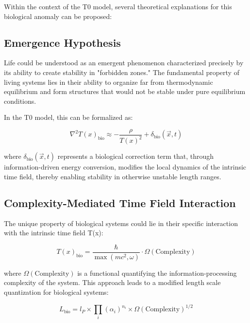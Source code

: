 \documentclass[12pt,a4paper]{article}
\newcommand{\Tfield}{T(x)}
\begin{document}
	Within the context of the T0 model, several theoretical explanations for this biological anomaly can be proposed:
	
	\subsection{Emergence Hypothesis}
	\label{subsec:emergenzhypothese}
	
	Life could be understood as an emergent phenomenon characterized precisely by its ability to create stability in "forbidden zones." The fundamental property of living systems lies in their ability to organize far from thermodynamic equilibrium and form structures that would not be stable under pure equilibrium conditions.
	
	In the T0 model, this can be formalized as:
	
	\begin{equation}
		\nabla^2\Tfield_{\text{bio}} \approx -\frac{\rho}{\Tfield^2} + \delta_{\text{bio}}(\vec{x}, t)
	\end{equation}
	
	where $\delta_{\text{bio}}(\vec{x}, t)$ represents a biological correction term that, through information-driven energy conversion, modifies the local dynamics of the intrinsic time field, thereby enabling stability in otherwise unstable length ranges.
	
	\subsection{Complexity-Mediated Time Field Interaction}
	\label{subsec:komplexitaet_interaktion}
	
	The unique property of biological systems could lie in their specific interaction with the intrinsic time field \Tfield:
	
	\begin{equation}
		\Tfield_{\text{bio}} = \frac{\hbar}{\max(mc^2, \omega)} \cdot \Omega(\text{Complexity})
	\end{equation}
	
	where $\Omega(\text{Complexity})$ is a functional quantifying the information-processing complexity of the system. This approach leads to a modified length scale quantization for biological systems:
	
	\begin{equation}
		L_{\text{bio}} = l_P \times \prod_{i} (\alpha_i)^{n_i} \times \Omega(\text{Complexity})^{1/2}
	\end{equation}
	
\end{document}

